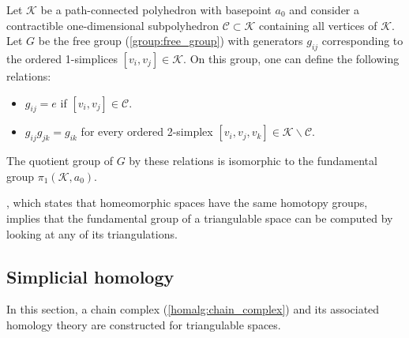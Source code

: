 

    \begin{property}
        Let $\mathcal{K}$ be a path-connected polyhedron with basepoint $a_0$ and consider a contractible one-dimensional subpolyhedron $\mathcal{C}\subset\mathcal{K}$ containing all vertices of $\mathcal{K}$. Let $G$ be the free group (\cref{group:free_group}) with generators $g_{ij}$ corresponding to the ordered 1-simplices $[v_i,v_j]\in\mathcal{K}$. On this group, one can define the following relations:
        \begin{itemize}
            \item $g_{ij} = e$ if $[v_i,v_j]\in\mathcal{C}$.
            \item $g_{ij}g_{jk} = g_{ik}$ for every ordered 2-simplex $[v_i,v_j,v_k]\in\mathcal{K}\backslash\mathcal{C}$.
        \end{itemize}
        The quotient group of $G$ by these relations is isomorphic to the fundamental group $\pi_1(\mathcal{K},a_0)$.
    \end{property}
    \begin{result}
        , which states that homeomorphic spaces have the same homotopy groups, implies that the fundamental group of a triangulable space can be computed by looking at any of its triangulations.
    \end{result}

\subsection{Simplicial homology}

    In this section, a chain complex (\cref{homalg:chain_complex}) and its associated homology theory are constructed for triangulable spaces.

